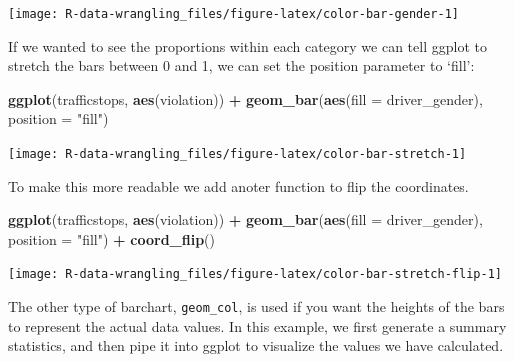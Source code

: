 \documentclass[]{book}
\newenvironment{Shaded}{\begin{snugshade}}{\end{snugshade}}
\newcommand{\CommentTok}[1]{\textcolor[rgb]{0.56,0.35,0.01}{\textit{#1}}}
\newcommand{\DataTypeTok}[1]{\textcolor[rgb]{0.13,0.29,0.53}{#1}}
\newcommand{\KeywordTok}[1]{\textcolor[rgb]{0.13,0.29,0.53}{\textbf{#1}}}
\newcommand{\NormalTok}[1]{#1}
\newcommand{\OperatorTok}[1]{\textcolor[rgb]{0.81,0.36,0.00}{\textbf{#1}}}
\newcommand{\OtherTok}[1]{\textcolor[rgb]{0.56,0.35,0.01}{#1}}
\newcommand{\StringTok}[1]{\textcolor[rgb]{0.31,0.60,0.02}{#1}}
\begin{document}
\texttt{[image: R-data-wrangling\_files/figure-latex/color-bar-gender-1]}

If we wanted to see the proportions within each category we can tell ggplot to stretch the bars between 0 and 1, we can set the position parameter to `fill':

\begin{Shaded}
\begin{Highlighting}[]
\KeywordTok{ggplot}\NormalTok{(trafficstops, }\KeywordTok{aes}\NormalTok{(violation)) }\OperatorTok{+}\StringTok{ }
\StringTok{  }\KeywordTok{geom_bar}\NormalTok{(}\KeywordTok{aes}\NormalTok{(}\DataTypeTok{fill =}\NormalTok{ driver_gender), }\DataTypeTok{position =} \StringTok{"fill"}\NormalTok{)}
\end{Highlighting}
\end{Shaded}

\texttt{[image: R-data-wrangling\_files/figure-latex/color-bar-stretch-1]}

To make this more readable we add anoter function to flip the coordinates.

\begin{Shaded}
\begin{Highlighting}[]
\KeywordTok{ggplot}\NormalTok{(trafficstops, }\KeywordTok{aes}\NormalTok{(violation)) }\OperatorTok{+}\StringTok{ }
\StringTok{  }\KeywordTok{geom_bar}\NormalTok{(}\KeywordTok{aes}\NormalTok{(}\DataTypeTok{fill =}\NormalTok{ driver_gender), }\DataTypeTok{position =} \StringTok{"fill"}\NormalTok{) }\OperatorTok{+}
\StringTok{  }\KeywordTok{coord_flip}\NormalTok{()}
\end{Highlighting}
\end{Shaded}

\texttt{[image: R-data-wrangling\_files/figure-latex/color-bar-stretch-flip-1]}

The other type of barchart, \texttt{geom\_col}, is used if you want the heights of the bars to represent the actual data values. In this example, we first generate a summary statistics, and then pipe it into ggplot to visualize the values we have calculated.

\begin{Shaded}
\end{Shaded}
\end{document}
